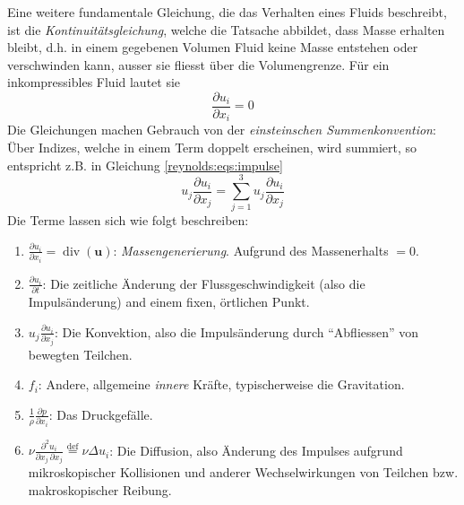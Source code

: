 Eine weitere fundamentale Gleichung, die das Verhalten eines Fluids beschreibt, ist die \emph{Kontinuitätsgleichung},
welche die Tatsache abbildet, dass Masse erhalten bleibt, d.h. in einem gegebenen Volumen Fluid keine Masse
entstehen oder verschwinden kann, ausser sie fliesst über die Volumengrenze. Für ein inkompressibles Fluid lautet sie
%
\begin{equation}
    \label{reynolds:eqs:mass}
    \frac{\partial u_i}{\partial x_i} = 0
\end{equation}
%
Die Gleichungen machen Gebrauch von der \emph{einsteinschen Summenkonvention}: Über Indizes, welche in einem Term doppelt
erscheinen, wird summiert, so entspricht z.B. in Gleichung \eqref{reynolds:eqs:impulse}
%
\begin{equation}
u_j \frac{\partial u_i}{\partial x_j} = \sum_{j=1}^{3} u_j \frac{\partial u_i}{\partial x_j}
\end{equation}
%
Die Terme lassen sich wie folgt beschreiben:
%
\begin{enumerate}
    \item $\frac{\partial u_i}{\partial x_i} = \operatorname{div}(\mathbf{u})$: \emph{Massengenerierung}.
    Aufgrund des Massenerhalts $ = 0$.
    \item $\frac{\partial u_i}{\partial t}$: Die zeitliche Änderung der Flussgeschwindigkeit (also die 
        Impulsänderung) and einem fixen, örtlichen Punkt.
    \item $u_j \frac{\partial u_i}{\partial x_j}$: Die Konvektion, also die Impulsänderung durch ``Abfliessen''
        von bewegten Teilchen.
    \item $f_i$: Andere, allgemeine \emph{innere} Kräfte, typischerweise die Gravitation.
    \item $\frac{1}{\rho} \frac{\partial p}{\partial x_i}$: Das Druckgefälle.
    \item $\nu \frac{\partial^2 u_i}{\partial x_j\, \partial x_j} \overset{\text{def}}{=} \nu \Delta u_i$: Die Diffusion, also Änderung des Impulses
        aufgrund mikroskopischer Kollisionen und anderer Wechselwirkungen von Teilchen bzw.
        makroskopischer Reibung.
\end{enumerate}
%

